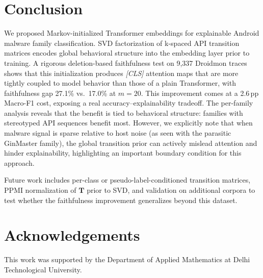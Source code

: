\documentclass[12pt]{article}
\begin{document}
\section{Conclusion}

We proposed Markov-initialized Transformer embeddings for explainable
Android malware family classification. SVD factorization of k-spaced
API transition matrices encodes global behavioral structure into the
embedding layer prior to training. A rigorous deletion-based faithfulness
test on 9,337 Droidmon traces shows that this initialization produces
\textit{[CLS]} attention maps that are more tightly coupled to model
behavior than those of a plain Transformer, with faithfulness gap
27.1\% vs.\ 17.0\% at $m{=}20$. This improvement comes at a 2.6\,pp
Macro-F1 cost, exposing a real accuracy--explainability tradeoff.
The per-family analysis reveals that the benefit is tied to behavioral
structure: families with stereotyped API sequences benefit most. However, we explicitly note that when malware signal is sparse relative to host noise (as seen with the parasitic GinMaster family), the global transition prior can actively mislead attention and hinder explainability, highlighting an important boundary condition for this approach.

Future work includes per-class or pseudo-label-conditioned transition
matrices, PPMI normalization of $\mathbf{T}$ prior to SVD, and
validation on additional corpora to test whether the faithfulness
improvement generalizes beyond this dataset.

\section*{Acknowledgements}

This work was supported by the Department of Applied Mathematics at Delhi Technological University.


\end{document}
